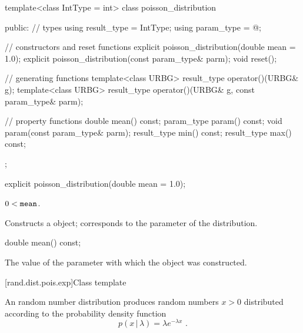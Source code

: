 %
\begin{codeblock}
template<class IntType = int>
  class poisson_distribution
  {
  public:
    // types
    using result_type = IntType;
    using param_type  = @\unspec@;

    // constructors and reset functions
    explicit poisson_distribution(double mean = 1.0);
    explicit poisson_distribution(const param_type& parm);
    void reset();

    // generating functions
    template<class URBG>
      result_type operator()(URBG& g);
    template<class URBG>
      result_type operator()(URBG& g, const param_type& parm);

    // property functions
    double mean() const;
    param_type param() const;
    void param(const param_type& parm);
    result_type min() const;
    result_type max() const;
  };
\end{codeblock}

%
\begin{itemdecl}
explicit poisson_distribution(double mean = 1.0);
\end{itemdecl}

\begin{itemdescr}
\pnum
\requires $0 < \texttt{mean}$.

\pnum
\effects Constructs a  object;
 corresponds to the parameter of the distribution.
\end{itemdescr}

%
\begin{itemdecl}
double mean() const;
\end{itemdecl}

\begin{itemdescr}
\pnum\returns The value of the  parameter
 with which the object was constructed.
\end{itemdescr}


[rand.dist.pois.exp]{Class template }%
%
%

\pnum
An  random number distribution
produces random numbers $x > 0$
distributed according to
the probability density function%
%
%
\[ p(x\,|\,\lambda) = \lambda e^{-\lambda x} \text{ .} \]

